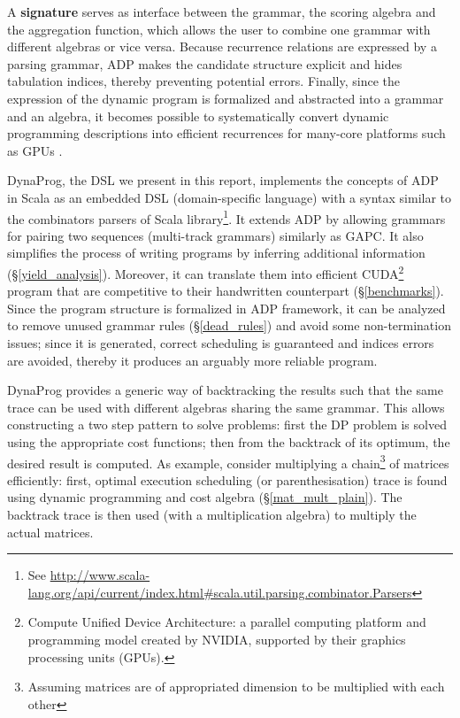 A \textbf{signature} serves as interface between the grammar, the scoring algebra and the aggregation function, which allows the user to combine one grammar with different algebras or vice versa. Because recurrence relations are expressed by a parsing grammar, ADP makes the candidate structure explicit and hides tabulation indices, thereby preventing potential errors. Finally, since the expression of the dynamic program is formalized and abstracted into a grammar and an algebra, it becomes possible to systematically convert dynamic programming descriptions into efficient recurrences for many-core platforms such as GPUs \cite{adp_gpu}.

DynaProg, the DSL we present in this report, implements the concepts of ADP in Scala as an embedded DSL (domain-specific language) with a syntax similar to the combinators parsers of Scala library\footnote{See \url{http://www.scala-lang.org/api/current/index.html\#scala.util.parsing.combinator.Parsers}}. It extends ADP by allowing grammars for pairing two sequences (multi-track grammars) similarly as GAPC\cite{gapc_thesis}. It also simplifies the process of writing programs by inferring additional information (\S\ref{yield_analysis}). Moreover, it can translate them into efficient CUDA\footnote{Compute Unified Device Architecture: a parallel computing platform and programming model created by NVIDIA, supported by their graphics processing units (GPUs).} program that are competitive to their handwritten counterpart (\S\ref{benchmarks}). Since the program structure is formalized in ADP framework, it can be analyzed to remove unused grammar rules (\S\ref{dead_rules}) and avoid some non-termination issues; since it is generated, correct scheduling is guaranteed and indices errors are avoided, thereby it produces an arguably more reliable program.

DynaProg provides a generic way of backtracking the results such that the same trace can be used with different algebras sharing the same grammar. This allows constructing a two step pattern to solve problems: first the DP problem is solved using the appropriate cost functions; then from the backtrack of its optimum, the desired result is computed. As example, consider multiplying a chain\footnote{Assuming matrices are of appropriated dimension to be multiplied with each other} of matrices efficiently: first, optimal execution scheduling (or parenthesisation) trace is found using dynamic programming and cost algebra (\S\ref{mat_mult_plain}). The backtrack trace is then used (with a multiplication algebra) to multiply the actual matrices.

